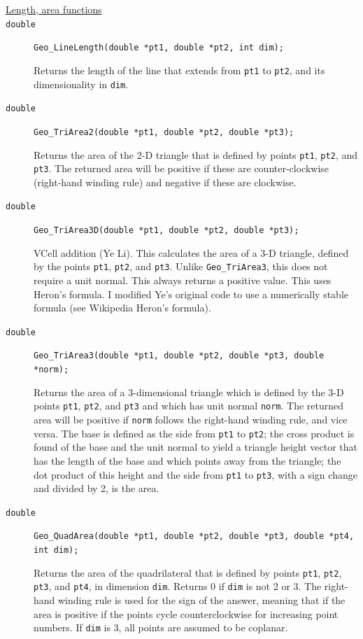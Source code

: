\documentclass[11pt]{article}
\newcommand {\ttt} {\texttt}
\begin{document}
\begin{description}
\item[\underline{Length, area functions}]

\item[\ttt{double}]
\ttt{Geo\_LineLength(double *pt1, double *pt2, int dim);}

Returns the length of the line that extends from \ttt{pt1} to \ttt{pt2}, and its dimensionality in \ttt{dim}.

\item[\ttt{double}]
\ttt{Geo\_TriArea2(double *pt1, double *pt2, double *pt3);}

Returns the area of the 2-D triangle that is defined by points \ttt{pt1}, \ttt{pt2}, and \ttt{pt3}. The returned area will be positive if these are counter-clockwise (right-hand winding rule) and negative if these are clockwise.

\item[\ttt{double}]
\ttt{Geo\_TriArea3D(double *pt1, double *pt2, double *pt3);}

VCell addition (Ye Li). This calculates the area of a 3-D triangle, defined by the points \ttt{pt1}, \ttt{pt2}, and \ttt{pt3}. Unlike \ttt{Geo\_TriArea3}, this does not require a unit normal. This always returns a positive value. This uses Heron's formula. I modified Ye's original code to use a numerically stable formula (see Wikipedia Heron's formula).

\item[\ttt{double}]
\ttt{Geo\_TriArea3(double *pt1, double *pt2, double *pt3, double *norm);}

Returns the area of a 3-dimensional triangle which is defined by the 3-D points \ttt{pt1}, \ttt{pt2}, and \ttt{pt3} and which has unit normal \ttt{norm}. The returned area will be positive if \ttt{norm} follows the right-hand winding rule, and vice versa.
The base is defined as the side from \ttt{pt1} to \ttt{pt2}; the cross product is found of the base and the unit normal to yield a triangle height vector that has the length of the base and which points away from the triangle; the dot product of this height and the side from \ttt{pt1} to \ttt{pt3}, with a sign change and divided by 2, is the area.

\item[\ttt{double}]
\ttt{Geo\_QuadArea(double *pt1, double *pt2, double *pt3, double *pt4, int dim);}

Returns the area of the quadrilateral that is defined by points \ttt{pt1}, \ttt{pt2}, \ttt{pt3}, and \ttt{pt4}, in dimension \ttt{dim}. Returns 0 if \ttt{dim} is not 2 or 3. The right-hand winding rule is used for the sign of the answer, meaning that if the area is positive if the points cycle counterclockwise for increasing point numbers. If \ttt{dim} is 3, all points are assumed to be coplanar.


\end{description}
\end{document}

